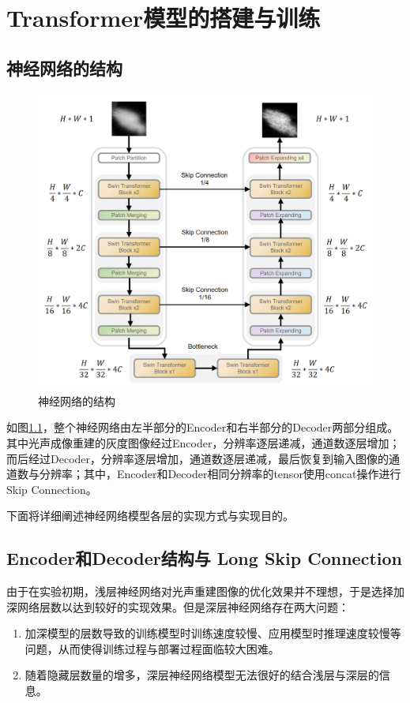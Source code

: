 \chapter{Transformer模型的搭建与训练}

\section{ 神经网络的结构}

\begin{figure}[h]
	\centering
	\includegraphics[width=0.9\columnwidth]{image/chap05/img501.png}
	\caption{神经网络的结构}
	\label{img501}
\end{figure}

如图\ref{img501}，整个神经网络由左半部分的Encoder和右半部分的Decoder两部分组成。其中光声成像重建的灰度图像经过Encoder，分辨率逐层递减，通道数逐层增加；而后经过Decoder，分辨率逐层增加，通道数逐层递减，最后恢复到输入图像的通道数与分辨率；其中，Encoder和Decoder相同分辨率的tensor使用concat操作进行Skip Connection。

下面将详细阐述神经网络模型各层的实现方式与实现目的。

\section{Encoder和Decoder结构与 Long Skip Connection}
由于在实验初期，浅层神经网络对光声重建图像的优化效果并不理想，于是选择加深网络层数以达到较好的实现效果。但是深层神经网络存在两大问题：

\begin{enumerate}
	\item 加深模型的层数导致的训练模型时训练速度较慢、应用模型时推理速度较慢等问题，从而使得训练过程与部署过程面临较大困难。
	\item 随着隐藏层数量的增多，深层神经网络模型无法很好的结合浅层与深层的信息。
\end{enumerate}

